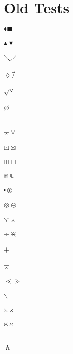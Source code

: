 \documentclass{article}
\begin{document}
\section{Old Tests}
$\blacklozenge \blacksquare $\\\\
$\blacktriangle \blacktriangledown $\\\\
$\diagdown \diagup $\\\\
$\lozenge \nexists $\\\\
$\surd \triangledown$\\\\
$\varnothing $\\\\      
\\
$\barwedge \veebar $\\\\
$\boxdot \boxtimes $\\\\
$\boxplus \boxminus $\\\\
$\Cap \Cup $\\\\
$\centerdot \circledast $\\\\
$\circledcirc \circleddash $\\\\
$\curlyvee \curlywedge $\\\\
$\div \divideontimes $\\\\
$\dotplus$\\\\
$\doublebarwedge \intercal$\\\\ 
$\lessdot \gtrdot $\\\\
$\smallsetminus$\\\\
$\leftthreetimes \rightthreetimes $\\\\
$\ltimes \rtimes $\\\\
\\
$\hslash$\\\\
\end{document}
